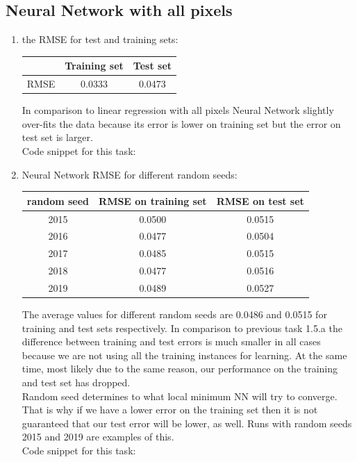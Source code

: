 \documentclass{article}
\begin{document}
		\subsection{Neural Network with all pixels}
			\begin{enumerate}[label=(\alph*)]
				\item
					the RMSE for test and training sets:
					\begin{center}
						\begin{tabular}{| c | c | c |}
							\hline
							\, & Training set & Test set \\ \hline
							RMSE  &  0.0333 & 0.0473 \\ 
							\hline
						\end{tabular}
					\end{center}
					In comparison to linear regression with all pixels Neural Network slightly over-fits the data because  its error is lower on training set but the error on test set is larger.\\
					Code snippet for this task:
					\newpage
					
					
				\item
					Neural Network RMSE for different random seeds:
					\begin{center}
						\begin{tabular}{| c | c | c |}
							\hline
							random seed & RMSE on training set & RMSE on test set\\ \hline
							2015 & 0.0500 & 0.0515 \\ 
							2016 & 0.0477 & 0.0504 \\ 
							2017 & 0.0485 & 0.0515 \\ 
							2018 & 0.0477 & 0.0516 \\ 
							2019 & 0.0489 & 0.0527 \\
							\hline
						\end{tabular}
					\end{center}
					The average values for different random seeds are 0.0486 and 0.0515 for training and test sets respectively. In comparison to previous task 1.5.a the difference between training and test errors is much smaller in all cases because we are not using all the training instances for learning. At the same time, most likely due to the same reason, our performance on the training and test set has dropped. \\
					Random seed determines to what local minimum NN will try to converge. That is why if we have a lower error on the training set then it is not guaranteed that our test error will be lower, as well. Runs with random seeds 2015 and 2019 are examples of this.\\
					Code snippet for this task:
					
			\end{enumerate}
\end{document}
